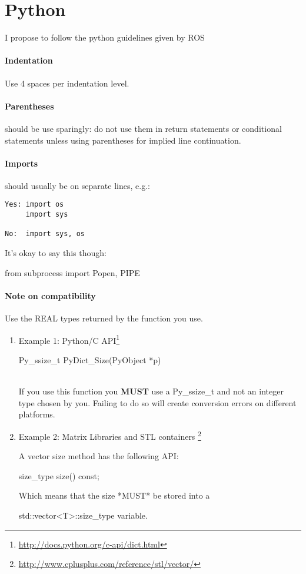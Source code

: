 \section{Python}
I propose to follow the python guidelines given by ROS \url{}

\paragraph{Indentation} Use 4 spaces per indentation level.

\paragraph{Parentheses} should be use sparingly: do not use them in return statements or conditional statements unless using parentheses for implied line continuation. %

\paragraph{Imports} should usually be on separate lines, e.g.:
\begin{verbatim}
Yes: import os
     import sys

No:  import sys, os
\end{verbatim}

It's okay to say this though:\\
\begin{tt}
from subprocess import Popen, PIPE
\end{tt}

\paragraph{Note on compatibility}
Use the REAL types returned by the function you use.
\begin{enumerate}
\item Example 1: Python/C API\footnote{\url{http://docs.python.org/c-api/dict.html}}\\
\begin{tt}Py\_ssize\_t PyDict\_Size(PyObject *p)\end{tt}\\
If you use this function you \textbf{MUST} use a Py\_ssize\_t and not an
integer type chosen by you.
Failing to do so will create conversion errors on different platforms.

\item Example 2: Matrix Libraries and STL containers
\footnote{\url{http://www.cplusplus.com/reference/stl/vector/}}

A vector size method has the following API:
\begin{tt}size\_type size() const;\end{tt}

Which means that the size *MUST* be stored into a
\begin{tt}std::vector<T>::size\_type variable.\end{tt}
\end{enumerate}




